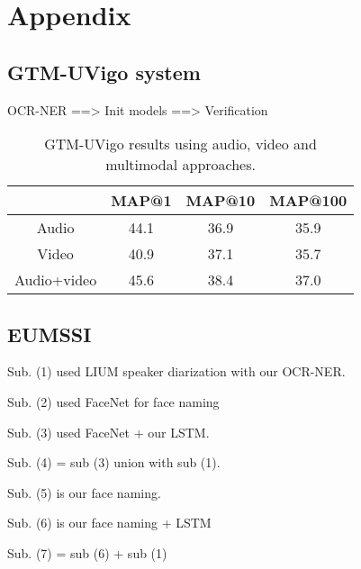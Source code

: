 \section{Appendix}

\subsection{GTM-UVigo system}

OCR-NER ==> Init models ==> Verification

\begin{table}[tb]
\centering
\begin{tabular}{c|c|c|c|}
\cline{2-4}
                                & MAP@1  & MAP@10 & MAP@100  \\ \hline
 \multicolumn{1}{|c|}{Audio} &  44.1  & 36.9   & 35.9 \\ \hline
 \multicolumn{1}{|c|}{Video} &  40.9  & 37.1   & 35.7 \\ \hline
 \multicolumn{1}{|c|}{Audio+video} & 45.6 & 38.4 & 37.0\\ \hline
 
\end{tabular}
\vspace*{-2mm}
\caption{GTM-UVigo results using audio, video and multimodal approaches.}
\vspace*{-2mm}
\label{tab:uvigo}
\end{table}

\subsection{EUMSSI}

\begin{compactitem}
  \item Sub. (1) used LIUM speaker diarization with our OCR-NER.
  \item Sub. (2) used FaceNet for face naming
	\item Sub. (3) used FaceNet + our LSTM.
	\item Sub. (4) = sub (3) union with sub (1).
	
	\item Sub. (5) is our face naming.
	\item Sub. (6) is our face naming + LSTM
	\item Sub. (7) = sub (6) + sub (1)
\end{compactitem}

